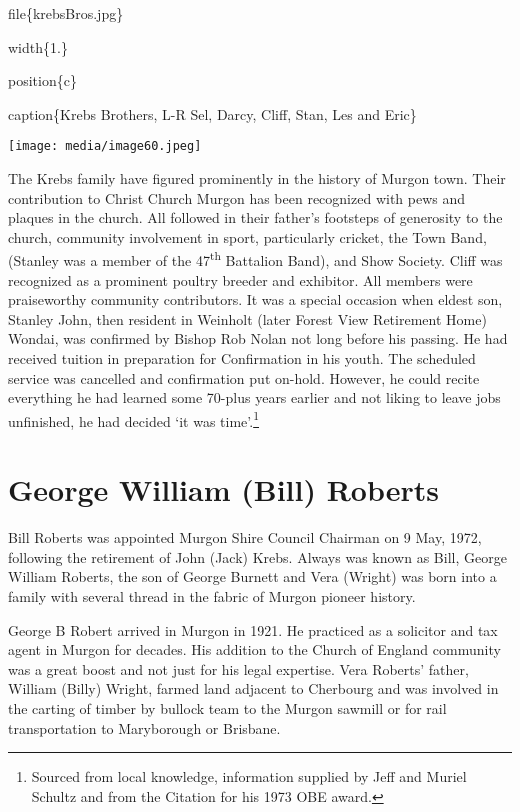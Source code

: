 file\{krebsBros.jpg\}

width\{1.\}

position\{c\}

caption\{Krebs Brothers, L-R Sel, Darcy, Cliff, Stan, Les and Eric\}

\texttt{[image: media/image60.jpeg]}

The Krebs family have figured prominently in the history of Murgon town. Their contribution to Christ Church Murgon has been recognized with pews and plaques in the church. All followed in their father's footsteps of generosity to the church, community involvement in sport, particularly cricket, the Town Band, (Stanley was a member of the 47\textsuperscript{th} Battalion Band), and Show Society. Cliff was recognized as a prominent poultry breeder and exhibitor. All members were praiseworthy community contributors. It was a special occasion when eldest son, Stanley John, then resident in Weinholt (later Forest View Retirement Home) Wondai, was confirmed by Bishop Rob Nolan not long before his passing. He had received tuition in preparation for Confirmation in his youth. The scheduled service was cancelled and confirmation put on-hold. However, he could recite everything he had learned some 70-plus years earlier and not liking to leave jobs unfinished, he had decided `it was time'.\footnote{Sourced from local knowledge, information supplied by Jeff and Muriel Schultz and from the Citation for his 1973 OBE award.}

\hypertarget{george-william-bill-roberts}{%
\section{George William (Bill) Roberts}\label{george-william-bill-roberts}}

Bill Roberts was appointed Murgon Shire Council Chairman on 9 May, 1972, following the retirement of John (Jack) Krebs. Always was known as Bill, George William Roberts, the son of George Burnett and Vera (Wright) was born into a family with several thread in the fabric of Murgon pioneer history.

George B Robert arrived in Murgon in 1921. He practiced as a solicitor and tax agent in Murgon for decades. His addition to the Church of England community was a great boost and not just for his legal expertise. Vera Roberts' father, William (Billy) Wright, farmed land adjacent to Cherbourg and was involved in the carting of timber by bullock team to the Murgon sawmill or for rail transportation to Maryborough or Brisbane.

